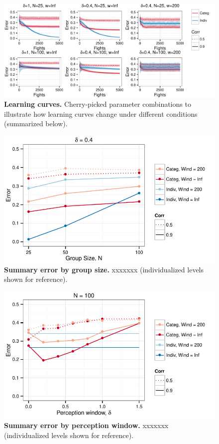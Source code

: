 \begin{figure}[ht]
\caption{\sffamily\small\textbf{Learning curves.}
     Cherry-picked parameter combinations to illustrate how learning curves change under different conditions (summarized below).}
\label{learning_curves}
\includegraphics[width=.95\textwidth]{figures/learning_curves.pdf}
\end{figure}

\begin{figure}
\caption{\sffamily\small\textbf{Summary error by group size.}
    xxxxxxx (individualized levels shown for reference).}
\label{summary_error_groupsize}
\includegraphics[width=.8\textwidth]{figures/summary_error_groupsize.pdf}
\end{figure}

\begin{figure}
\caption{\sffamily\small\textbf{Summary error by perception window.}
    xxxxxxx (individualized levels shown for reference).}
\label{summary_error}
\includegraphics[width=.8\textwidth]{figures/summary_error_percwindow.pdf}
\end{figure}

